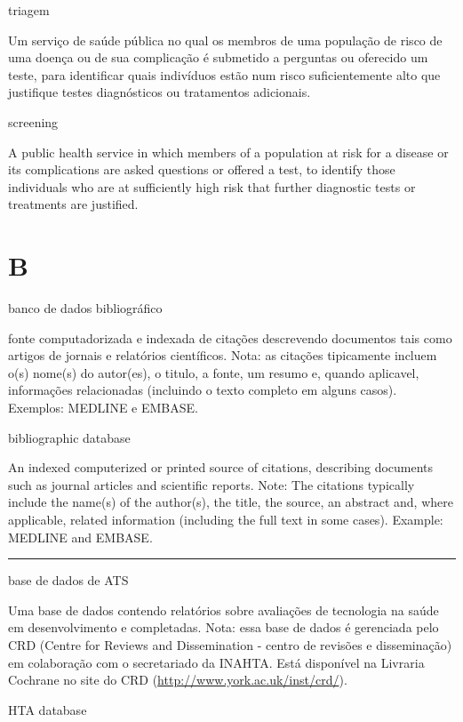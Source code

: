 \documentclass[
  openany]{book}
\begin{document}
triagem

Um serviço de saúde pública no qual os membros de uma população de risco de uma doença ou de sua complicação é submetido a perguntas ou oferecido um teste, para identificar quais indivíduos estão num risco suficientemente alto que justifique testes diagnósticos ou tratamentos adicionais.

screening

A public health service in which members of a population at risk for a disease or its complications are asked questions or offered a test, to identify those individuals who are at sufficiently high risk that further diagnostic tests or treatments are justified.

\hypertarget{b-1}{%
\chapter*{B}\label{b-1}}

banco de dados bibliográfico

fonte computadorizada e indexada de citações descrevendo documentos tais como artigos de jornais e relatórios científicos. Nota: as citações tipicamente incluem o(s) nome(s) do autor(es), o titulo, a fonte, um resumo e, quando aplicavel, informações relacionadas (incluindo o texto completo em alguns casos). Exemplos: MEDLINE e EMBASE.

bibliographic database

An indexed computerized or printed source of citations, describing documents such as journal articles and scientific reports. Note: The citations typically include the name(s) of the author(s), the title, the source, an abstract and, where applicable, related information (including the full text in some cases). Example: MEDLINE and EMBASE.

\begin{center}\rule{0.5\linewidth}{0.5pt}\end{center}

base de dados de ATS

Uma base de dados contendo relatórios sobre avaliações de tecnologia na saúde em desenvolvimento e completadas. Nota: essa base de dados é gerenciada pelo CRD (Centre for Reviews and Dissemination - centro de revisões e disseminação) em colaboração com o secretariado da INAHTA. Está disponível na Livraria Cochrane no site do CRD (\url{http://www.york.ac.uk/inst/crd/}).

HTA database
\end{document}
